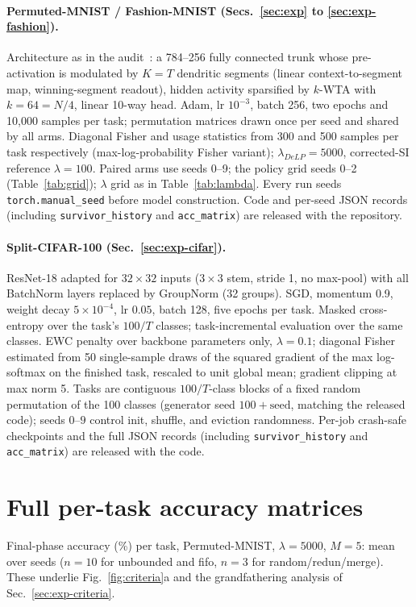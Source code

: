 \documentclass[review,12pt,number]{elsarticle}
\newcommand{\delp}{DeLP}
\begin{document}
\paragraph{Permuted-MNIST / Fashion-MNIST (Secs.~\ref{sec:exp}
to \ref{sec:exp-fashion}).}
Architecture as in the audit~\cite{zhou2026delp}: a 784--256 fully
connected trunk whose pre-activation is modulated by $K{=}T$ dendritic
segments (linear context-to-segment map, winning-segment readout),
hidden activity sparsified by $k$-WTA with $k{=}64 = N/4$, linear
10-way head. Adam, lr $10^{-3}$, batch 256, two epochs and 10{,}000
samples per task; permutation matrices drawn once per seed and shared
by all arms. Diagonal Fisher and usage statistics from 300 and 500
samples per task respectively (max-log-probability Fisher variant);
$\lambda_{\delp}{=}5000$, corrected-SI reference $\lambda{=}100$.
Paired arms use seeds 0--9; the policy grid seeds 0--2 (Table~\ref{tab:grid});
$\lambda$ grid as in Table~\ref{tab:lambda}. Every run seeds
\texttt{torch.manual\_seed} before model construction. Code and
per-seed JSON records (including \texttt{survivor\_history} and
\texttt{acc\_matrix}) are released with the repository.

\begin{sloppypar}
\paragraph{Split-CIFAR-100 (Sec.~\ref{sec:exp-cifar}).}
ResNet-18 adapted for $32{\times}32$ inputs ($3{\times}3$ stem,
stride 1, no max-pool) with all BatchNorm layers replaced by GroupNorm
(32 groups). SGD, momentum 0.9, weight decay $5{\times}10^{-4}$, lr
$0.05$, batch 128, five epochs per task. Masked cross-entropy over the
task's $100/T$ classes; task-incremental evaluation over the same classes.
EWC penalty over backbone parameters only, $\lambda{=}0.1$; diagonal
Fisher estimated from 50 single-sample draws of the squared gradient
of the max log-softmax on the finished task, rescaled to unit global
mean; gradient clipping at max norm 5. Tasks are contiguous
$100/T$-class blocks of a fixed random permutation of the 100 classes
(generator seed $100{+}\mathrm{seed}$, matching the released code);
seeds $0$--$9$ control init,
shuffle, and eviction randomness. Per-job crash-safe checkpoints and
the full JSON records (including \texttt{survivor\_history} and
\texttt{acc\_matrix}) are released with the code.
\end{sloppypar}

\begin{sloppypar}
\section{Full per-task accuracy matrices}
Final-phase accuracy (\%) per task, Permuted-MNIST, $\lambda{=}5000$,
$M{=}5$: mean over seeds ($n{=}10$ for unbounded and fifo, $n{=}3$ for
random/redun/merge). These underlie Fig.~\ref{fig:criteria}a and the
grandfathering analysis of Sec.~\ref{sec:exp-criteria}.
\end{sloppypar}
\end{document}
